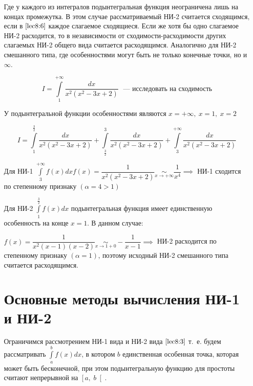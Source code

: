 \documentclass[../../main.tex]{subfiles}
\begin{document}
Где у каждого из интегралов подынтегральная функция неограничена лишь на 
концах промежутка. В этом случае рассматриваемый НИ-2 считается сходящимся, 
если в $\eqref{lec8:6}$ каждое слагаемое сходящиеся. Если же хотя бы одно 
слагаемое НИ-2 расходится, то в независимости от сходимости-расходимости 
других слагаемых НИ-2 общего вида считается расходящимся. Аналогично для НИ-2 
смешанного типа, где особенностями могут быть не только конечные точки, но и 
$\infty$.

\begin{exmp}
\[I = \int\limits_{1}^{+\infty}\dfrac{dx}{x^2(x^2 - 3x + 2)} \text{ ~--- 
исследовать на сходимость} \]

У подынтегральной функции особенностями являются $x = +\infty,\; x = 1,\; x = 
2$

\[I = \int\limits_{1}^{\frac{3}{2}}\dfrac{dx}{x^2(x^2 - 3x +2 )} + 
\int\limits_{\frac{3}{2}}^{3}\dfrac{dx}{x^2(x^2 - 3x +2 )} + 
\int\limits_{3}^{+\infty}\dfrac{dx}{x^2(x^2 - 3x +2 )}\]

Для НИ-1 $\displaystyle\int\limits_{3}^{+\infty}f(x)dx f(x) = 
\dfrac{1}{x^2(x^2 -3x + 2)} \underset{x \to +\infty} \sim \dfrac{1}{x^4} 
\implies$ НИ-1 сходится по степенному признаку $\left(\alpha = 4 > 1\right)$

Для НИ-2 $\displaystyle\int\limits_{1}^{\frac{3}{2}}f(x)dx$ подынтегральная 
функция имеет единственную особенность на конце $x = 1$. В данном случае:

$f(x) = \dfrac{1}{x^2(x-1)(x-2)} \underset{x \to 1 + 0}\sim -\dfrac{1}{x - 1} 
\implies$ НИ-2 расходится по степенному признаку $\left(\alpha = 1\right)$, 
поэтому исходный НИ-2 смешанного типа считается расходящимся. 
\end{exmp}

\section{Основные методы вычисления НИ-1 и НИ-2}

Ограничимся рассмотрением НИ-1 вида и НИ-2 вида $\eqref{lec8:3}$ т.~е. будем 
рассматривать $\displaystyle\int\limits_{a}^{b}f(x)dx$, в котором $b$ 
единственная особенная точка, которая может быть бесконечной, при этом 
подынтегральную функцию для простоты считают непрерывной на $\left[a,\; 
b\right[$. 
\end{document}
